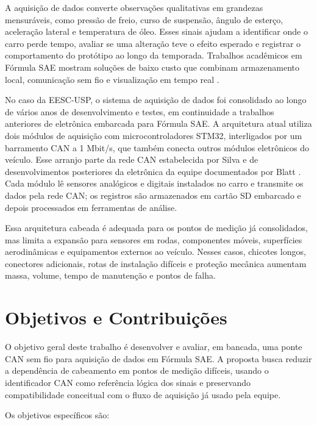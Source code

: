 A aquisição de dados converte observações qualitativas em grandezas mensuráveis,
como pressão de freio, curso de suspensão, ângulo de esterço, aceleração lateral e
temperatura de óleo. Esses sinais ajudam a identificar onde o carro perde tempo,
avaliar se uma alteração teve o efeito esperado e registrar o comportamento do
protótipo ao longo da temporada. Trabalhos acadêmicos em Fórmula SAE mostram
soluções de baixo custo que combinam armazenamento local, comunicação sem fio e
visualização em tempo real
\cite{stoffman2004_low_cost_racing_daq,visconti2019_formula_sae_telemetry,zanetti2013_formula_sae_wireless,lauro2021_formula_sae_telemetria}.

No caso da EESC-USP, o sistema de aquisição de dados foi consolidado ao longo de
vários anos de desenvolvimento e testes, em continuidade a trabalhos anteriores de
eletrônica embarcada para Fórmula SAE. A arquitetura atual utiliza dois módulos
de aquisição com microcontroladores STM32, interligados por um barramento CAN a
1 Mbit/s, que também conecta outros módulos eletrônicos do veículo. Esse arranjo
parte da rede CAN estabelecida por Silva e de desenvolvimentos posteriores da
eletrônica da equipe documentados por Blatt
\cite{silva2009_rede_can_formula_sae,blatt2020_aquisicao_formula_sae}. Cada módulo lê
sensores analógicos e digitais instalados no carro e transmite os dados pela rede
CAN; os registros são armazenados em cartão SD embarcado e depois processados em
ferramentas de análise.

Essa arquitetura cabeada é adequada para os pontos de medição já consolidados, mas
limita a expansão para sensores em rodas, componentes móveis, superfícies
aerodinâmicas e equipamentos externos ao veículo. Nesses casos, chicotes longos,
conectores adicionais, rotas de instalação difíceis e proteção mecânica aumentam
massa, volume, tempo de manutenção e pontos de falha.

\section{Objetivos e Contribuições}

O objetivo geral deste trabalho é desenvolver e avaliar, em bancada, uma ponte CAN
sem fio para aquisição de dados em Fórmula SAE. A proposta busca reduzir a
dependência de cabeamento em pontos de medição difíceis, usando o identificador CAN como referência lógica dos sinais e preservando compatibilidade conceitual com o
fluxo de aquisição já usado pela equipe.

Os objetivos específicos são:

